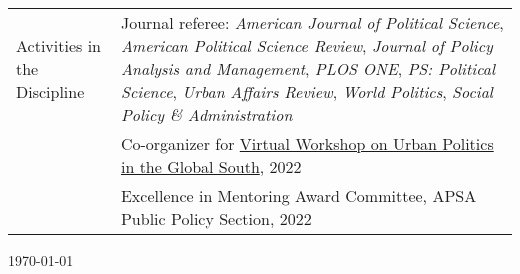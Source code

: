 \documentclass[letterpaper, 10pt]{article}
\begin{document}
\begin{longtable}{p{1.5in}p{5in}}

\nohyphens{{Activities in the Discipline}}&Journal referee: \textit{American Journal of Political Science}, \textit{American Political Science Review}, \textit{Journal of Policy Analysis and Management}, \textit{PLOS ONE}, \textit{PS: Political Science}, \textit{Urban Affairs Review}, \textit{World Politics}, \textit{Social Policy \& Administration}\\ 
 & Co-organizer for \href{https://www.globalsouthurbanpols.com}{Virtual Workshop on Urban Politics in the Global South}, 2022\\


&Excellence in Mentoring Award Committee, APSA Public Policy Section, 2022 \\






\end{longtable}
\vspace*{\fill}
\flushright \monthyeardate\today 
\end{document}
